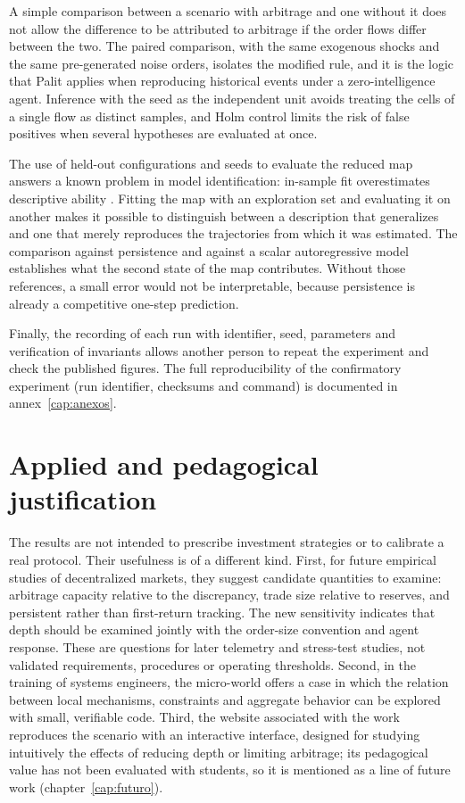 A simple comparison between a scenario with arbitrage and one without it does not allow the difference to be attributed to arbitrage if the order flows differ between the two. The paired comparison, with the same exogenous shocks and the same pre-generated noise orders, isolates the modified rule, and it is the logic that Palit \cite{palit2022shuffled} applies when reproducing historical events under a zero-intelligence agent. Inference with the seed as the independent unit avoids treating the cells of a single flow as distinct samples, and Holm control limits the risk of false positives when several hypotheses are evaluated at once.

The use of held-out configurations and seeds to evaluate the reduced map answers a known problem in model identification: in-sample fit overestimates descriptive ability \cite{lamperti2018surrogates}. Fitting the map with an exploration set and evaluating it on another makes it possible to distinguish between a description that generalizes and one that merely reproduces the trajectories from which it was estimated. The comparison against persistence and against a scalar autoregressive model establishes what the second state of the map contributes. Without those references, a small error would not be interpretable, because persistence is already a competitive one-step prediction.

Finally, the recording of each run with identifier, seed, parameters and verification of invariants \cite{grimm2020odd,railsback2019agent} allows another person to repeat the experiment and check the published figures. The full reproducibility of the confirmatory experiment (run identifier, checksums and command) is documented in annex~\ref{cap:anexos}.

\section{Applied and pedagogical justification}

The results are not intended to prescribe investment strategies or to calibrate a real protocol. Their usefulness is of a different kind. First, for future empirical studies of decentralized markets, they suggest candidate quantities to examine: arbitrage capacity relative to the discrepancy, trade size relative to reserves, and persistent rather than first-return tracking. The new sensitivity indicates that depth should be examined jointly with the order-size convention and agent response. These are questions for later telemetry and stress-test studies, not validated requirements, procedures or operating thresholds. Second, in the training of systems engineers, the micro-world offers a case in which the relation between local mechanisms, constraints and aggregate behavior can be explored with small, verifiable code. Third, the website associated with the work reproduces the scenario with an interactive interface, designed for studying intuitively the effects of reducing depth or limiting arbitrage; its pedagogical value has not been evaluated with students, so it is mentioned as a line of future work (chapter~\ref{cap:futuro}).

